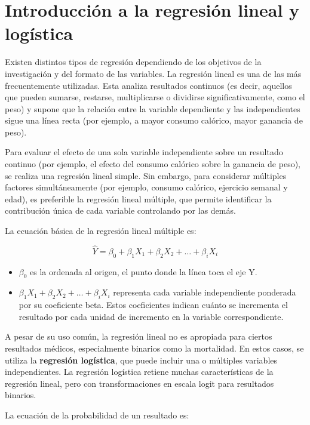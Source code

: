 
\section{Introducción a la regresión lineal y logística}

Existen distintos tipos de regresión dependiendo de los objetivos de la investigación y del formato de las variables. La regresión lineal es una de las más frecuentemente utilizadas. Esta analiza resultados continuos (es decir, aquellos que pueden sumarse, restarse, multiplicarse o dividirse significativamente, como el peso) y supone que la relación entre la variable dependiente y las independientes sigue una línea recta (por ejemplo, a mayor consumo calórico, mayor ganancia de peso).

Para evaluar el efecto de una sola variable independiente sobre un resultado continuo (por ejemplo, el efecto del consumo calórico sobre la ganancia de peso), se realiza una regresión lineal simple. Sin embargo, para considerar múltiples factores simultáneamente (por ejemplo, consumo calórico, ejercicio semanal y edad), es preferible la regresión lineal múltiple, que permite identificar la contribución única de cada variable controlando por las demás.

La ecuación básica de la regresión lineal múltiple es:

\[
\hat{Y} = \beta_0 + \beta_1 X_1 + \beta_2 X_2 + \ldots + \beta_i X_i
\]

\begin{itemize}
  \item $\beta_0$ es la ordenada al origen, el punto donde la línea toca el eje Y.
  \item $\beta_1 X_1 + \beta_2 X_2 + \ldots + \beta_i X_i$ representa cada variable independiente ponderada por su coeficiente beta. Estos coeficientes indican cuánto se incrementa el resultado por cada unidad de incremento en la variable correspondiente.
\end{itemize}

A pesar de su uso común, la regresión lineal no es apropiada para ciertos resultados médicos, especialmente binarios como la mortalidad. En estos casos, se utiliza la \textbf{regresión logística}, que puede incluir una o múltiples variables independientes. La regresión logística retiene muchas características de la regresión lineal, pero con transformaciones en escala logit para resultados binarios.

La ecuación de la probabilidad de un resultado es:

